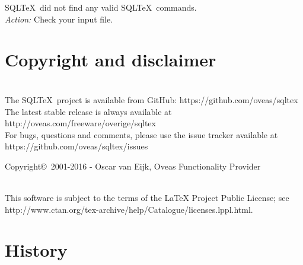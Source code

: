 \documentclass{article}
\begin{document}
\noindent SQL\TeX\ did not find any valid SQL\TeX\ commands. \\
\textit{Action:} Check your input file.


\section{Copyright and disclaimer}

\noindent\hrulefill \\
The SQL\TeX\ project is available from GitHub: https://github.com/oveas/sqltex\\
The latest stable release is always available at http://oveas.com/freeware/overige/sqltex\\
For bugs, questions and comments, please use the issue tracker available at https://github.com/oveas/sqltex/issues

\vspace{3mm}

\noindent Copyright\copyright\ 2001-2016 - Oscar van Eijk, Oveas Functionality Provider

\noindent\hrulefill \\

\noindent This software is subject to the terms of the LaTeX Project Public License; 
see http://www.ctan.org/tex-archive/help/Catalogue/licenses.lppl.html.

\section{History}
\end{document}
